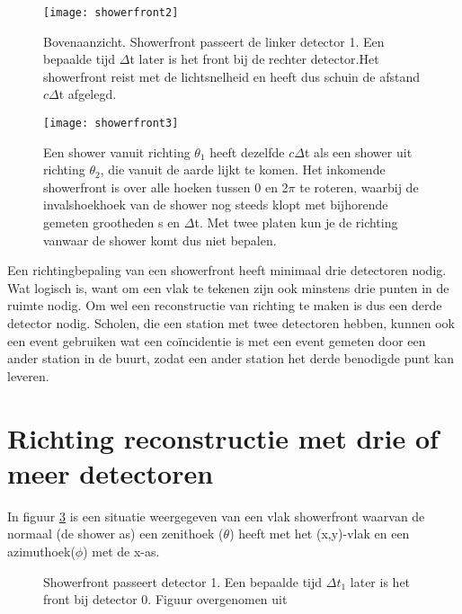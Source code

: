 \begin{figure}
    \centering
    \texttt{[image: showerfront2]}
    \caption{Bovenaanzicht. Showerfront passeert de linker detector 1. Een bepaalde tijd $\Delta$t later is het front bij de rechter detector.Het showerfront reist met de lichtsnelheid en heeft dus schuin de afstand $c\Delta$t afgelegd.}
   \label{fig:showerfront2}
\end{figure}

\begin{figure}
    \centering
    \texttt{[image: showerfront3]}
    \caption{Een shower vanuit richting $\theta_{1}$ heeft dezelfde $c\Delta$t als een shower uit richting  $\theta_{2}$, die vanuit de aarde lijkt te komen.
 Het inkomende showerfront is over alle hoeken tussen 0 en 2$\pi$ te roteren, waarbij de invalshoekhoek van de shower nog steeds klopt met bijhorende gemeten grootheden s en  $\Delta$t.  Met twee platen kun je de richting vanwaar de shower komt dus niet bepalen. }
   \label{fig:showerfront3}
\end{figure}

Een richtingbepaling van een showerfront heeft minimaal drie detectoren nodig. Wat logisch is, want om een vlak te tekenen zijn ook minstens drie punten in de ruimte nodig.
Om wel een reconstructie van richting te maken is dus een derde detector nodig. Scholen, die een station met twee detectoren hebben, kunnen ook een event gebruiken wat een coïncidentie is met een event gemeten door een ander station in de buurt, zodat een ander station het derde benodigde punt kan leveren. 

\section{Richting reconstructie met drie of meer detectoren}


In figuur \ref{fig:frontthesis} is een situatie weergegeven van een vlak showerfront waarvan de normaal (de shower as) een zenithoek ($\theta$) heeft met het (x,y)-vlak en een azimuthoek($\phi$) met de x-as.

\begin{figure}
    \centering
    
  
    \caption{Showerfront passeert detector 1. Een bepaalde tijd $\Delta t_1$ later is het front bij detector 0.  Figuur overgenomen uit  \cite{Fokkema}}
  \label{fig:frontthesis}
\end{figure}

